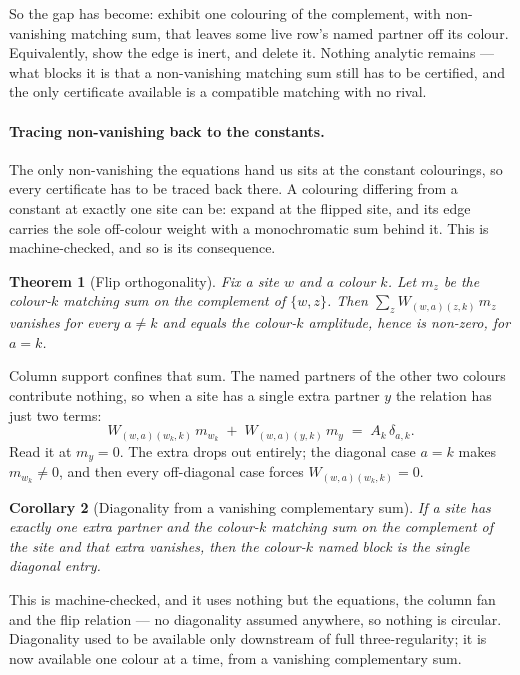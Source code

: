 \documentclass[11pt]{article}
\newtheorem{theorem}{Theorem}[section]
\newtheorem{corollary}[theorem]{Corollary}
\theoremstyle{definition}
\theoremstyle{remark}
\begin{document}
So the gap has become: exhibit one colouring of the complement, with non-vanishing matching
sum, that leaves some live row's named partner off its colour. Equivalently, show the edge
is inert, and delete it. Nothing analytic remains --- what blocks it is that a
non-vanishing matching sum still has to be certified, and the only certificate available
is a compatible matching with no rival.

\paragraph{Tracing non-vanishing back to the constants.} The only non-vanishing the
equations hand us sits at the constant colourings, so every certificate has to be traced
back there. A colouring differing from a constant at exactly one site can be: expand at the
flipped site, and its edge carries the sole off-colour weight with a monochromatic sum
behind it. This is machine-checked, and so is its consequence.

\begin{theorem}[Flip orthogonality]\label{thm:flip}
Fix a site $w$ and a colour $k$. Let $m_z$ be the colour-$k$ matching sum on the complement
of $\{w,z\}$. Then $\sum_z W_{(w,a)(z,k)}\, m_z$ vanishes for every $a \neq k$ and equals
the colour-$k$ amplitude, hence is non-zero, for $a = k$.
\end{theorem}

Column support confines that sum. The named partners of the other two colours contribute
nothing, so when a site has a single extra partner $y$ the relation has just two terms:
\[
  W_{(w,a)(w_k,k)}\, m_{w_k} \;+\; W_{(w,a)(y,k)}\, m_y \;=\; A_k\,\delta_{a,k}.
\]
Read it at $m_y = 0$. The extra drops out entirely; the diagonal case $a = k$ makes
$m_{w_k} \neq 0$, and then every off-diagonal case forces $W_{(w,a)(w_k,k)} = 0$.

\begin{corollary}[Diagonality from a vanishing complementary sum]\label{cor:diagzero}
If a site has exactly one extra partner and the colour-$k$ matching sum on the complement of
the site and that extra vanishes, then the colour-$k$ named block is the single diagonal
entry.
\end{corollary}

This is machine-checked, and it uses nothing but the equations, the column fan and the flip
relation --- no diagonality assumed anywhere, so nothing is circular. Diagonality used to be
available only downstream of full three-regularity; it is now available one colour at a
time, from a vanishing complementary sum.
\end{document}
